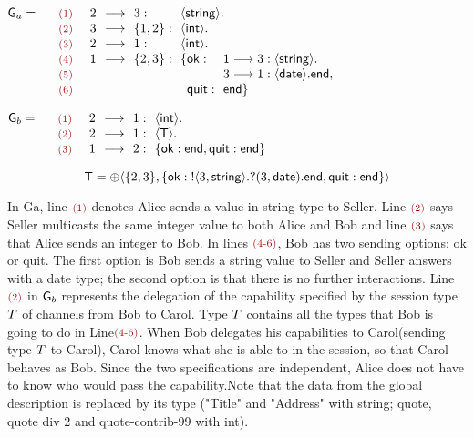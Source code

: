 \documentclass[a4paper]{article}
\newcommand{\nm}[1]{\text{\textsc{\color{lucared}\footnotesize (#1)}}}
\begin{document}
{\small
\begin{minipage}{.5\textwidth}$%
\cloG_a  = {} \\
\begin{array}[t]{ll@{~~~~}*{7}{l@{~~}}}
  & \nm{1} & 2 & \redsym & 3: & \multicolumn{2}{@{}l@{~~}}{\langle \kf{string}\rangle.} \\
  & \nm{2} & 3 & \redsym & \{1,2\}: & \langle \mathsf{int}\rangle. \\
  & \nm{3} & 2 & \redsym & 1: & \langle \mathsf{int}\rangle. \\
  & \nm{4} & 1 & \redsym & \{2,3\}: & \{\mathsf{ok:} & 1 \redsym 3:\langle \kf{string}\rangle.\\
  & \nm{5} & & & & & 3 \redsym 1: \langle \kf{date}\rangle .\End,\\
  & \nm{6} & & & & \phantom{\{} \mathsf{quit}: & \End\}
\end{array}$\end{minipage}\qquad\qquad
\begin{minipage}{.5\textwidth}$\cloG_b  = {} \\
\begin{array}[t]{ll@{~~~~}*{7}{l@{~~}}}
  & \nm{1} & 2 & \redsym & 1: & \langle \kf{int}\rangle .\\
  & \nm{2} & 2 & \redsym & 1: & \langle \cloT \rangle .\\
  & \nm{3} & 1 & \redsym & 2: & \{\mathsf{ok}:
  \End, \mathsf{quit}: \End\} \\
\end{array}$\end{minipage}
\[\mathsf{T}  = {\oplus} \langle\{2,3\},\{\mathsf{ok}:{!}\langle
3,\textup{\textsf{string}}\rangle.
{?}(3, \textup{\textsf{date}}). \textup{\textsf{end}}, \mathsf{quit}: \textup{\textsf{end}}\}\rangle\]
}

In Ga, line $\nm{1}$ denotes Alice sends a value in string type to Seller. Line $\nm2$ says Seller multicasts the same integer value to both Alice and Bob and line $\nm{3}$ says that Alice sends an integer to Bob. In lines $\nm{4-6}$, Bob has two sending options: ok or quit. The first option is Bob sends a string value to Seller and Seller answers with a date type; the second option is that there is no further interactions. 
Line $\nm 2$ in $\mathsf{G}_b$ represents the delegation of the capability specified by the session type $T$ of channels from Bob to Carol. Type $T$ contains all the types that Bob is going to do in Line$\nm{4-6}$. When Bob delegates his capabilities to Carol(sending type $T$ to Carol), Carol knows what she is able to in the session, so that Carol behaves as Bob. Since the two specifications are independent, Alice does not have to know who would pass the capability.Note that the data from the global description is replaced by its type ("Title" and "Address" with string; quote, quote div 2 and quote-contrib-99 with int).
\end{document}
